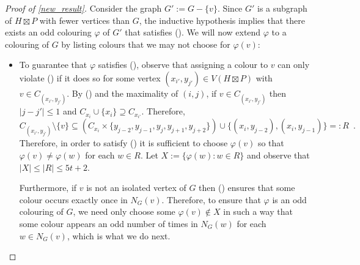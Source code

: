\documentclass{patmorin}
\begin{document}
\begin{proof}[Proof of \cref{new_result}]
  Consider the graph $G':= G-\{v\}$. Since $G'$ is a subgraph of $H\boxtimes P$ with fewer vertices than $G$, the inductive hypothesis implies that there exists an odd colouring $\varphi$ of $G'$ that satisfies ().  We will now extend $\varphi$ to a colouring of $G$ by listing colours that we may not choose for $\varphi(v)$:
  \begin{itemize}
    \item To guarantee that $\varphi$ satisfies (), observe that assigning a colour to $v$ can only violate () if it does so for some vertex $(x_{i'},y_{j'})\in V(H\boxtimes P)$ with $v\in C_{(x_{i'},y_{j'})}$.  By () and the maximality of $(i,j)$, if $v\in C_{(x_{i'},y_{j'})}$ then $|j-j'|\le 1$ and $C_{x_{i}}\cup\{x_i\}\supseteq C_{x_{i'}}$.  Therefore,
    \[
        C_{(x_{i'},y_{j'})}\setminus\{v\}\subseteq
          \left(C_{x_i} \times \{y_{j-2},y_{j-1},y_j,y_{j+1},y_{j+2}\}\right)
          \cup \{(x_i,y_{j-2}),(x_i,y_{j-1})\} =: R \enspace .
    \]
    Therefore, in order to satisfy () it is sufficient to choose $\varphi(v)$ so that $\varphi(v)\neq\varphi(w)$ for each $w\in R$.  Let $X:=\{\varphi(w): w\in R\}$ and observe that $|X|\le |R| \le 5t+2$.

    Furthermore, if $v$ is not an isolated vertex of $G$ then () ensures that some colour occurs exactly once in $N_G(v)$. Therefore, to ensure that $\varphi$ is an odd colouring of $G$, we need only choose some $\varphi(v)\not\in X$ in such a way that some colour appears an odd number of times in $N_G(w)$ for each $w\in N_G(v)$, which is what we do next.


\end{itemize}
\end{proof}
\end{document}
